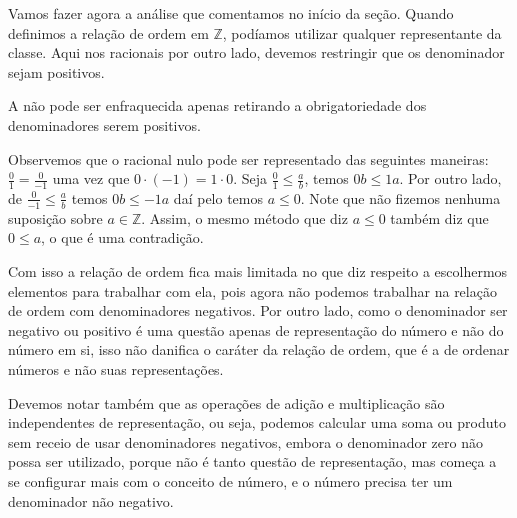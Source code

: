 \documentclass[../main.tex]{subfiles}
\begin{document}
Vamos fazer agora a análise que comentamos no início da seção. Quando definimos a relação de ordem em $\mathbb{Z}$, podíamos utilizar qualquer representante da classe. Aqui nos racionais por outro lado, devemos restringir que os denominador sejam positivos.

\begin{afi}
    A  não pode ser enfraquecida apenas retirando a obrigatoriedade dos denominadores serem positivos.
\end{afi}

\begin{dem}
    Observemos que o racional nulo pode ser representado das seguintes maneiras: $\frac{0}{1} = \frac{0}{-1}$ uma vez que $0 \cdot (-1) = 1 \cdot 0$.
    Seja $\frac{0}{1} \leq \frac{a}{b}$, temos $0b \leq 1a$. Por outro lado, de $\frac{0}{-1} \leq \frac{a}{b}$ temos $0b \leq -1a$ 
    daí pelo  temos $a \leq 0$. Note que não fizemos nenhuma suposição sobre $a \in \mathbb{Z}$. Assim, o mesmo método que diz $a \leq 0$ também diz que $0 \leq a$, o que é uma contradição.
\end{dem}

Com isso a relação de ordem fica mais limitada no que diz respeito a escolhermos elementos para trabalhar com ela, pois agora não podemos trabalhar na relação de ordem com denominadores negativos. Por outro lado, como o denominador ser negativo ou positivo é uma questão apenas de representação do número e não do número em si, isso não danifica o caráter da relação de ordem, que é a de ordenar números e não suas representações. 

Devemos notar também que as operações de adição e multiplicação são independentes de representação, ou seja, podemos calcular uma soma ou produto sem receio de usar denominadores negativos, embora o denominador zero não possa ser utilizado, porque não é tanto questão de representação, mas começa a se configurar mais com o conceito de número, e o número precisa ter um denominador não negativo.
\end{document}
